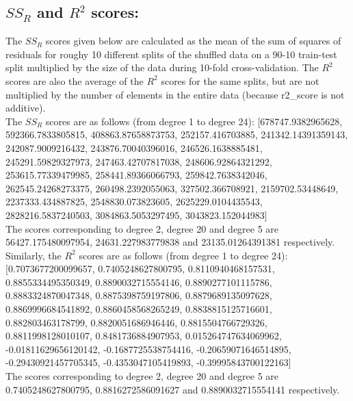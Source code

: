 \subsection{$SS_R$ and $R^2$ scores: }
The $SS_R$ scores given below are calculated as the mean of the sum of squares of residuals for roughy 10 different splits of the shuffled data on a 90-10 train-test split multiplied by the size of the data during 10-fold cross-validation. The $R^2$ scores are also the average of the $R^2$ scores for the same splits, but are not multiplied by the number of elements in the entire data (because r2\_score is not additive).\\
The $SS_R$ scores are as follows (from degree 1 to degree 24):
[678747.9382965628, 592366.7833805815, 408863.87658873753, 252157.416703885, 241342.14391359143, 242087.9009216432, 243876.70040396016, 246526.1638885481, 245291.59829327973, 247463.42707817038, 248606.92864321292, 253615.77339479985, 258441.89366066793, 259842.7638342046, 262545.24268273375, 260498.2392055063, 327502.366708921, 2159702.53448649, 2237333.434887825, 2548830.073823605, 2625229.0104435543, 2828216.5837240503, 3084863.5053297495, 3043823.152044983]\\
The scores corresponding to degree 2, degree 20 and degree 5 are 56427.175480097954, 24631.227983779838 and 23135.01264391381 respectively.\\

Similarly, the $R^2$ scores are as follows (from degree 1 to degree 24):
[0.7073677200099657, 0.7405248627800795, 0.8110940468157531, 0.8855334495350349, 0.8890032715554146, 0.8890277101115786, 0.8883324870047348, 0.8875398759197806, 0.8879689135097628, 0.8869996684541892, 0.8860458568265249, 0.8838815125716601, 0.882803463178799, 0.8820051686946446, 0.8815504766729326, 0.8811998128010107, 0.8481736884907953, 0.015264747634069962, -0.01811629656120142, -0.1687725538754416, -0.20659071646514895, -0.29430921457705345, -0.4353047105419893, -0.39995843700122163]\\
The scores corresponding to degree 2, degree 20 and degree 5 are 0.7405248627800795, 0.8816272586091627 and 0.8890032715554141 respectively.\\
\newpage 